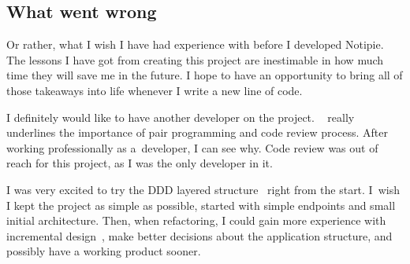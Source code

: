 \subsection{What went wrong}\label{sec:what-went-wrong}

Or rather,
what I wish I have had experience with
before I developed Notipie.
The lessons I have got from creating this project
are inestimable in how much time they will save me
in the future.
I hope to have an opportunity to
bring all of those takeaways into life
whenever I write a new line of code.

I definitely would like to have another developer
on the project.
~\cite{beck_extreme_2004}
really underlines the importance of pair programming
and code review process.
After working professionally as a~developer,
I can see why.
Code review was out of reach for this project,
as I was the only developer in it.

I was very excited to try the
\ac{DDD} layered structure~\cite{evans_domain-driven_2003}
right from the start.
I~wish I kept the project as simple as possible,
started with simple endpoints
and small initial architecture.
Then, when refactoring,
I could gain more experience
with incremental design~\cite{fowler_refactoring_2019,beck_extreme_2004},
make better decisions about the application structure,
and possibly have a working product sooner.
